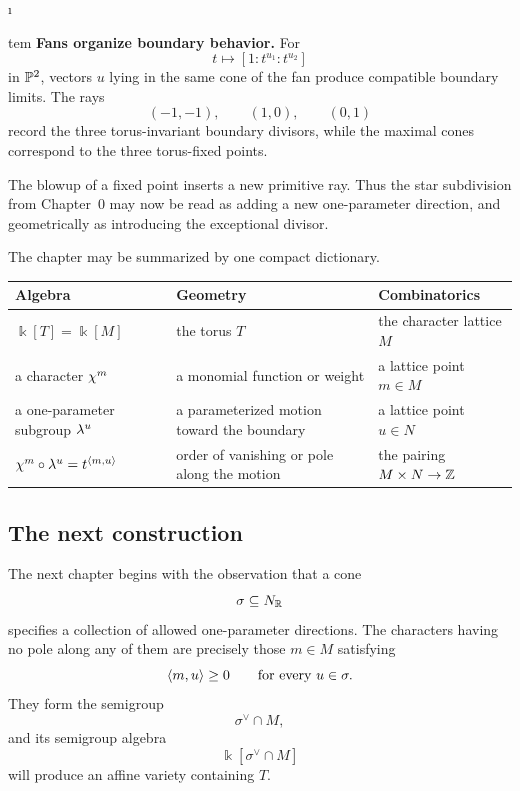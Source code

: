 \begin{enumerate}[label=\textbf{\arabic*.},wide=0pt]
\i

tem \textbf{Fans organize boundary behavior.}
For
\[
t\longmapsto[1:t^{u_1}:t^{u_2}]
\]
in \(\mathbb{P}^2\), vectors \(u\) lying in the same cone of the fan produce
compatible boundary limits. The rays
\[
(-1,-1),\qquad(1,0),\qquad(0,1)
\]
record the three torus-invariant boundary divisors, while the maximal
cones correspond to the three torus-fixed points.

The blowup of a fixed point inserts a new primitive ray. Thus the star
subdivision from Chapter~0 may now be read as adding a new
one-parameter direction, and geometrically as introducing the
exceptional divisor.

\end{enumerate}

\begin{threedictionaries}
The chapter may be summarized by one compact dictionary.

\medskip

\begin{center}
\small
\begin{tabularx}{\linewidth}{@{}
  >{\raggedright\arraybackslash}X
  >{\raggedright\arraybackslash}X
  >{\raggedright\arraybackslash}X@{}}
\toprule
\textbf{Algebra}
&
\textbf{Geometry}
&
\textbf{Combinatorics}
\\
\midrule
\(\Bbbk[T]=\Bbbk[M]\)
&
the torus \(T\)
&
the character lattice \(M\)
\\[1mm]
a character \(\chi^{m}\)
&
a monomial function or weight
&
a lattice point \(m\in M\)
\\[1mm]
a one-parameter subgroup \(\lambda^{u}\)
&
a parameterized motion toward the boundary
&
a lattice point \(u\in N\)
\\[1mm]
\(\chi^{m}\circ\lambda^{u}=t^{\left\langle m,u\right\rangle}\)
&
order of vanishing or pole along the motion
&
the pairing \(M\times N\to\mathbb{Z}\)
\\
\bottomrule
\end{tabularx}
\end{center}
\end{threedictionaries}

\subsection*{The next construction}

The next chapter begins with the observation that a cone
\[
\sigma\subseteq N_{\mathbb{R}}
\]
specifies a collection of allowed one-parameter directions. The
characters having no pole along any of them are precisely those
\(m\in M\) satisfying
\[
\left\langle m,u\right\rangle\geq0
\qquad
\text{for every }u\in\sigma.
\]
They form the semigroup
\[
\sigma^\vee\cap M,
\]
and its semigroup algebra
\[
\Bbbk[\sigma^\vee\cap M]
\]
will produce an affine variety containing \(T\).

